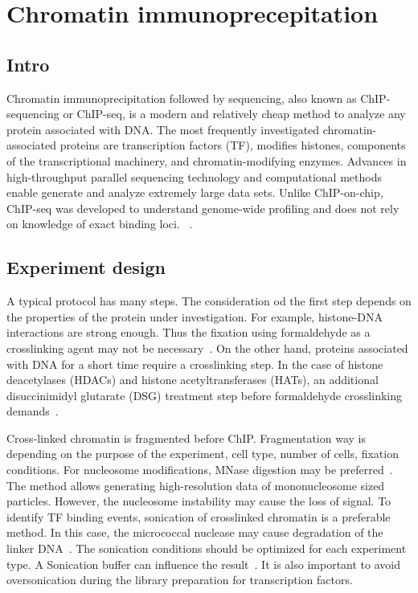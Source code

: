 \chapter{Chromatin immunoprecepitation}

\section{Intro}
Chromatin immunoprecipitation followed by sequencing, also known as ChIP-sequencing or ChIP-seq, is a modern and relatively cheap method to analyze any protein associated with DNA. 
The most frequently investigated chromatin-associated proteins are transcription factors (TF), modifies histones, components of the transcriptional machinery, and chromatin-modifying enzymes.
Advances in high-throughput parallel sequencing technology and computational methods enable generate and analyze extremely large data sets. 
Unlike ChIP-on-chip, ChIP-seq was developed to understand genome-wide profiling and does not rely on knowledge of exact binding loci.~\cite{park2009chip} .


\section{Experiment design}

A typical protocol has many steps. 
The consideration od the first step depends on the properties of the protein under investigation. 
For example, histone-DNA interactions are strong enough. 
Thus the fixation using formaldehyde as a crosslinking agent may not be necessary~\cite{barski2008identification}. 
On the other hand, proteins associated with DNA for a short time require a crosslinking step. 
In the case of histone deacetylases (HDACs) and histone acetyltransferases (HATs), an additional disuccinimidyl glutarate (DSG) treatment step before formaldehyde crosslinking demands~\cite{wang2009genome}. 

Cross-linked chromatin is fragmented before ChIP. 
Fragmentation way is depending on the purpose of the experiment, cell type, number of cells, fixation conditions. 
For nucleosome modifications, MNase digestion may be preferred~\cite{kidder2011chip}.  
The method allows generating high-resolution data of mononucleosome sized particles. 
However, the nucleosome instability may cause the loss of signal.
To identify TF binding events, sonication of crosslinked chromatin is a preferable method. 
In this case, the micrococcal nuclease may cause degradation of the linker DNA~\cite{kidder2011chip}.
The sonication conditions should be optimized for each experiment type. 
A Sonication buffer can influence the result~\cite{steger2008dot1l}. 
It is also important to avoid oversonication during the library preparation for transcription factors. 


